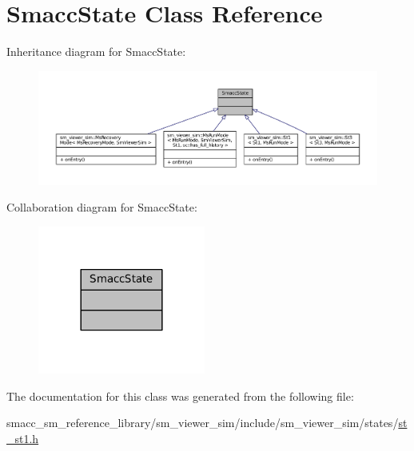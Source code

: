 \hypertarget{classSmaccState}{}\section{Smacc\+State Class Reference}
\label{classSmaccState}


Inheritance diagram for Smacc\+State\+:
\nopagebreak
\begin{figure}[H]
\begin{center}
\leavevmode
\includegraphics[width=350pt]{classSmaccState__inherit__graph}
\end{center}
\end{figure}


Collaboration diagram for Smacc\+State\+:
\nopagebreak
\begin{figure}[H]
\begin{center}
\leavevmode
\includegraphics[width=156pt]{classSmaccState__coll__graph}
\end{center}
\end{figure}


The documentation for this class was generated from the following file\+:\begin{DoxyCompactItemize}
\item 
smacc\+\_\+sm\+\_\+reference\+\_\+library/sm\+\_\+viewer\+\_\+sim/include/sm\+\_\+viewer\+\_\+sim/states/\hyperlink{st__st1_8h}{st\+\_\+st1.\+h}\end{DoxyCompactItemize}
